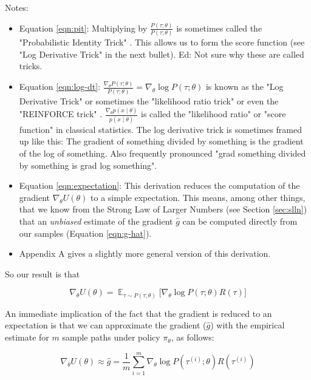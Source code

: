 \documentclass[11pt, oneside]{article}   	%
\DeclareMathOperator{\E}{\mathbb{E}}
\begin{document}
\bigskip
\noindent
Notes:
\begin{itemize}
\item Equation \ref{eqn:pit}: Multiplying by $\frac{P(\tau;\theta)} {P(\tau;\theta)}$ is sometimes called the "Probabilistic Identity Trick"  \cite{log_derivative_trick}. This allows us to form
the score function (see "Log Derivative Trick" in the next bullet). Ed: Not sure why these are called tricks.
\item Equation \ref{eqn:log-dt}:  $\frac{\nabla_{\theta} P(\tau;\theta)}{P(\tau;\theta)} = \nabla_{\theta} \log P(\tau;\theta)$ is known as the "Log Derivative Trick" \cite{log_derivative_trick} or 
sometimes the "likelihood ratio trick" or even the "REINFORCE trick" \cite{Williams1992} .
$\frac{\nabla_{\theta} p(x \mid \theta)}{p(x \mid \theta)}$ is called the "likelihood ratio" or "score function" in classical statistics. 
The log derivative trick is sometimes framed up like this: 
The gradient of something divided by something is the gradient of the log of something. Also frequently
pronounced "grad something divided by something is grad log something".
\item  Equation \ref{eqn:expectation}: This derivation reduces the computation of the gradient $\nabla_{\theta}U(\theta)$ to a simple expectation. 
This means, among other things,  that we know from the Strong Law of Larger Numbers (see Section \ref{sec:slln}) that an \emph{unbiased} estimate of the gradient $\hat{g}$
can be computed directly from our samples (Equation \ref{eqn:g-hat}).
\item Appendix A gives a slightly more general version of this derivation.
\end{itemize}

\bigskip
\noindent
So our result is that 

\begin{equation}
\nabla_{\theta} U(\theta) = \E_{\tau \sim P(\tau;\theta)} \Big [\nabla_{\theta} \log P(\tau; \theta) R(\tau) \Big ]
\label{eqn:egradient}
\end{equation}

\bigskip
\noindent
An immediate implication of the fact that the gradient is reduced to an expectation is that we can approximate the gradient ($\hat{g}$) with the empirical estimate for $m$ 
sample paths under policy $\pi_\theta$,  as follows:

\begin{equation}
\nabla_\theta U(\theta) \approx \hat{g} = \frac{1}{m} \sum\limits_{i = 1}^{m} \nabla_{\theta} \log  P(\tau^{(i)} ; \theta) R(\tau^{(i)})
\label{eqn:g-hat}
\end{equation}
\end{document}

